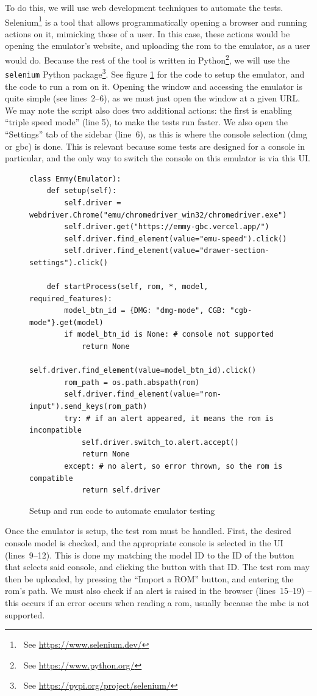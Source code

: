 \documentclass[11pt]{informatics-report}
\newcommand{\ftnt}[1]{\footnote{~See \url{#1}}}
\begin{document}
To do this, we will use web development techniques to automate the tests. Selenium\ftnt{https://www.selenium.dev/} is a tool that allows programmatically opening a browser and running actions on it, mimicking those of a user. In this case, these actions would be opening the emulator's website, and uploading the \gls{rom} to the emulator, as a user would do. Because the rest of the tool is written in Python\ftnt{https://www.python.org/}, we will use the \texttt{selenium} Python package\ftnt{https://pypi.org/project/selenium/}. See figure \ref{fig:selenium-testing} for the code to setup the emulator, and the code to run a \gls{rom} on it. Opening the window and accessing the emulator is quite simple (see lines~2--6), as we must just open the window at a given URL. We may note the script also does two additional actions: the first is enabling ``triple speed mode'' (line 5), to make the tests run faster. We also open the ``Settings'' tab of the sidebar (line~6), as this is where the console selection (\gls{dmg} or \gls{gbc}) is done. This is relevant because some tests are designed for a console in particular, and the only way to switch the console on this emulator is via this UI.

\begin{figure}[h]
    \begin{verbatim}
class Emmy(Emulator):
    def setup(self):
        self.driver = webdriver.Chrome("emu/chromedriver_win32/chromedriver.exe")
        self.driver.get("https://emmy-gbc.vercel.app/")
        self.driver.find_element(value="emu-speed").click()
        self.driver.find_element(value="drawer-section-settings").click()

    def startProcess(self, rom, *, model, required_features):
        model_btn_id = {DMG: "dmg-mode", CGB: "cgb-mode"}.get(model)
        if model_btn_id is None: # console not supported
            return None
        self.driver.find_element(value=model_btn_id).click()
        rom_path = os.path.abspath(rom)
        self.driver.find_element(value="rom-input").send_keys(rom_path)
        try: # if an alert appeared, it means the rom is incompatible
            self.driver.switch_to.alert.accept()
            return None
        except: # no alert, so error thrown, so the rom is compatible
            return self.driver
    \end{verbatim}
    \caption{Setup and run code to automate emulator testing}
    \label{fig:selenium-testing}
\end{figure}

Once the emulator is setup, the test \gls{rom} must be handled. First, the desired console model is checked, and the appropriate console is selected in the UI (lines~9--12). This is done my matching the model ID to the ID of the button that selects said console, and clicking the button with that ID. The test \gls{rom} may then be uploaded, by pressing the ``Import a ROM'' button, and entering the \gls{rom}'s path. We must also check if an alert is raised in the browser (lines~15--19) -- this occurs if an error occurs when reading a \gls{rom}, usually because the \gls{mbc} is not supported.
\end{document}
